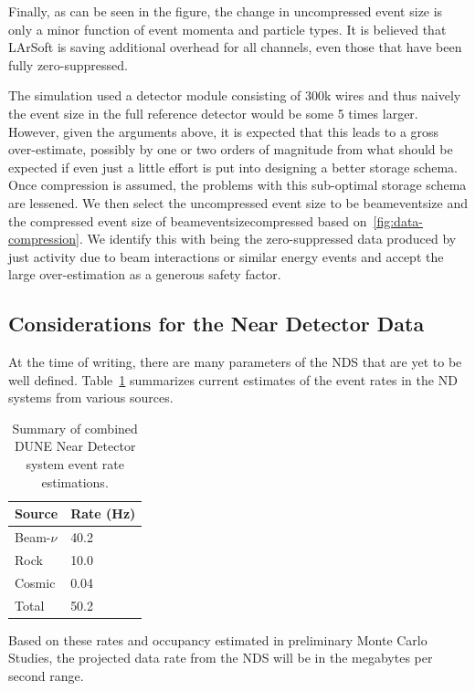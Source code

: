 Finally, as can be seen in the figure, the change in uncompressed
event size is only a minor function of event momenta and particle types.
It is believed that LArSoft is saving additional overhead for all
channels, even those that have been fully zero-suppressed.

The simulation used a detector module consisting of 300k wires and thus naively the event
size in the full reference detector would be some 5 times larger.
However, given the arguments above, it is expected that this leads to
a gross over-estimate, possibly by one or two orders of magnitude from
what should be expected if even just a little effort is put into
designing a better storage schema.
Once compression is assumed, the problems with this sub-optimal
storage schema are lessened.
We then select the uncompressed event size to be beameventsize and
the compressed event size of beameventsizecompressed based
on~\ref{fig:data-compression}.
We identify this with being the zero-suppressed data produced by just
activity due to beam interactions or similar energy events and accept
the large over-estimation as a generous safety factor.

\subsection{Considerations for the Near Detector Data}
At the time of writing, there are many parameters of the NDS that are yet to be well defined.
Table~\ref{tab:nds-event-rates} summarizes current estimates of the event rates
in the ND systems from various sources.

\begin{table}[ht!]
\centering
\begin{tabular}{| p{1in} | p{1in} |}		\hline		
\textbf{Source} & \textbf{Rate} (Hz)\\ \hline
Beam-$\nu$ & 40.2 \\ \hline
Rock & 10.0 \\ \hline
Cosmic & 0.04 \\ \hline
Total & 50.2 \\ \hline
\end{tabular}
\caption{Summary of combined DUNE Near Detector system event rate estimations.}
\label{tab:nds-event-rates}
\end{table}

Based on these rates and occupancy estimated in preliminary Monte Carlo Studies, the projected
data rate from the NDS will be in the megabytes per second range.